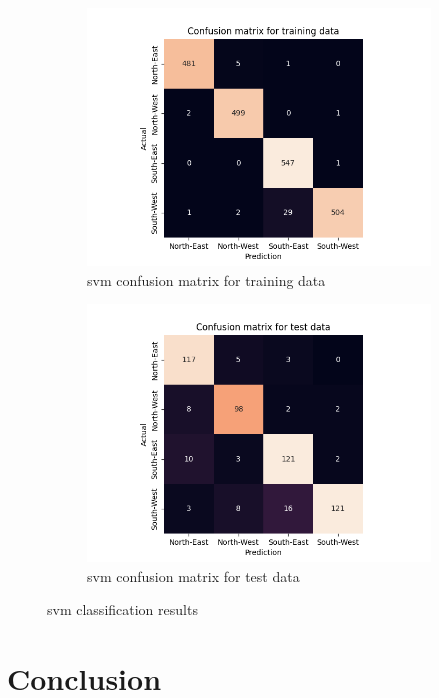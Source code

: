 \documentclass[10pt,twocolumn,letterpaper]{article}
\begin{document}
\begin{figure}
  \centering
  \begin{subfigure}{.49\linewidth}
    \includegraphics[width=\linewidth]{svm_cfsn_train}
    \caption{\acrshort{svm} confusion matrix for training data}
    \label{fig:svm_train}
  \end{subfigure}
  \hfill
  \begin{subfigure}{0.49\linewidth}
    \includegraphics[width=\linewidth]{svm_cfsn_test}
    \caption{\acrshort{svm} confusion matrix for test data}
    \label{fig:svm_test}
  \end{subfigure}
  \caption{\acrlong{svm} classification results}
  \label{fig:svm_res}
\end{figure}

\section{Conclusion}
\label{sec:conclusion}


{\small


}
\end{document}
